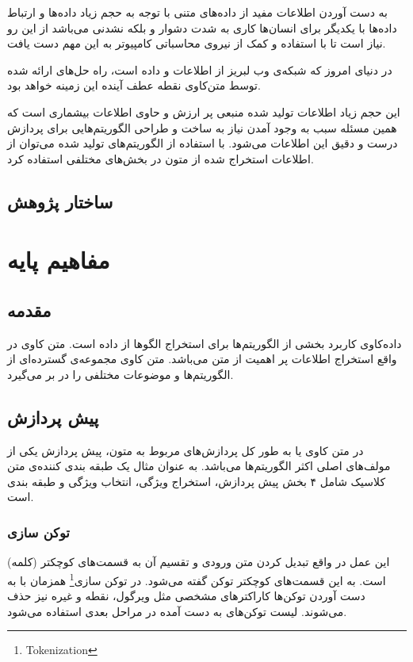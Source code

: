 \documentclass[12pt, a4paper, oneside]{report}
\begin{document}
به دست آوردن اطلاعات مفید از داده‌های متنی با توجه به حجم زیاد داده‌ها و ارتباط داده‌ها با یکدیگر
برای انسان‌ها کاری به شدت دشوار و بلکه نشدنی می‌باشد از این رو نیاز است تا با استفاده و کمک
از نیروی محاسباتی کامپیوتر به این مهم دست یافت.
\cite{zhang2018deep}

در دنیای امروز که شبکه‌ی وب لبریز از اطلاعات و داده است، راه حل‌های ارائه شده توسط متن‌کاوی نقطه
عطف آینده این زمینه خواهد بود\cite{8844895}.


این حجم زیاد اطلاعات تولید شده منبعی پر ارزش و حاوی اطلاعات بیشماری است که همین مسئله سبب به وجود آمدن نیاز به
ساخت و طراحی الگوریتم‌هایی برای پردازش درست و دقیق این اطلاعات می‌شود. با استفاده از الگوریتم‌های تولید شده می‌توان از
اطلاعات استخراج شده از متون در بخش‌های مختلفی استفاده کرد\cite{DBLP:journals/corr/AllahyariPASTGK17a}.


\section{ساختار پژوهش}

\chapter{مفاهیم پایه}
\pagebreak
\section{مقدمه}

داده‌کاوی کاربرد بخشی از الگوریتم‌ها برای استخراج الگو‌ها از داده است. متن کاوی در واقع استخراج اطلاعات پر اهمیت از
متن می‌باشد. متن کاوی مجموعه‌ی گسترده‌ای از الگوریتم‌ها و موضوعات مختلفی را در بر می‌گیرد\cite{c9d4fbeac7324056bed5d1cb262a7268}.

\section{پیش پردازش}

در متن کاوی یا به طور کل پردازش‌های مربوط به متون، پیش پردازش یکی از مولف‌های اصلی اکثر الگوریتم‌ها می‌باشد.
به عنوان مثال یک طبقه بندی کننده‌ی متن کلاسیک شامل ۴ بخش پیش پردازش، استخراج ویژگی، انتخاب ویژگی و طبقه بندی است\cite{DBLP:journals/corr/AllahyariPASTGK17a}.

\subsection{توکن سازی}

این عمل در واقع تبدیل کردن متن ورودی و تقسیم آن به قسمت‌های کوچکتر
(کلمه)
است. به این قسمت‌های کوچکتر توکن گفته می‌شود. در
توکن سازی\footnote{Tokenization}
همزمان با به دست آوردن توکن‌ها کاراکتر‌های مشخصی مثل ویرگول، نقطه و غیره نیز حذف می‌شوند.
لیست توکن‌های به دست آمده در مراحل بعدی استفاده می‌شود\cite{DBLP:journals/corr/AllahyariPASTGK17a}.
\end{document}
